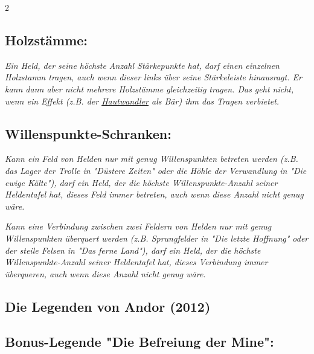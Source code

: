 \documentclass[10pt, a4paper, oneside]{book}
\newcommand{\fan}[1]{\textit{#1}}
\begin{document}
\begin{multicols*}{2}
\begin{nobgcolor}
\subsection{Holzstämme:}

\fan{Ein Held, der seine höchste Anzahl Stärkepunkte hat, darf einen einzelnen Holzstamm tragen, auch wenn dieser links über seine Stärkeleiste hinausragt. Er kann dann aber nicht mehrere Holzstämme gleichzeitig tragen. Das geht nicht, wenn ein Effekt (z.B. der \hyperref[hautwandler]{Hautwandler} als Bär) ihm das Tragen verbietet.} 




\subsection{Willenspunkte-Schranken:}

\fan{Kann ein Feld von Helden nur mit genug Willenspunkten betreten werden (z.B. das Lager der Trolle in "Düstere Zeiten" oder die Höhle der Verwandlung in "Die ewige Kälte"), darf ein Held, der die höchste Willenspunkte-Anzahl seiner Heldentafel hat, dieses Feld immer betreten, auch wenn diese Anzahl nicht genug wäre.}

\fan{Kann eine Verbindung zwischen zwei Feldern von Helden nur mit genug Willenspunkten überquert werden (z.B. Sprungfelder in "Die letzte Hoffnung" oder der steile Felsen in "Das ferne Land"), darf ein Held, der die höchste Willenspunkte-Anzahl seiner Heldentafel hat, dieses Verbindung immer überqueren, auch wenn diese Anzahl nicht genug wäre.}









\end{nobgcolor}








\begin{bgcolor}
\section{Die Legenden von Andor (2012)}




\subsection{Bonus-Legende "Die Befreiung der Mine":}


\end{bgcolor}
\end{multicols*}
\end{document}
